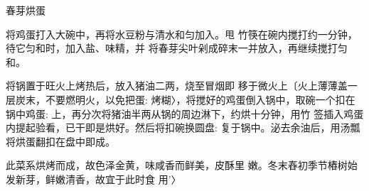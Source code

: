 \begin{recipe}{春芽烘蛋}

\ingredients


\cooking

\step 	将鸡蛋打入大碗中，再将水豆粉与清水和匀加入。甩 竹筷在碗内搅打约一分钟，待它匀和时，加入盐、味精，并 将春芽尖叶剁成碎末一并放入，再继续搅打匀和。

\step 	将锅置于旺火上烤热后，放入猪油二两，烧至冒烟即 移于微火上〔火上薄薄盖一层炭末，不要燃明火，以免把蛋: 烤糊〉，将搅好的鸡蛋倒入锅中，取碗一个扣在锅中鸡蛋: 上，再分次将猪油半两从锅的周边淋下，约烘十分钟，用竹 签插入鸡蛋内提起验看，已干即是烘好。然后将扣碗换圆盘: 复于锅中。泌去余油后，用汤瓢将烘蛋翻扣在盘中即成。

\notes

此菜系烘烤而成，故色泽金黄，味咸香而鲜美，皮酥里 嫩。冬末舂初季节樁树始发新芽，鲜嫩清香，故宜于此时食 用'〉

\end{recipe}

